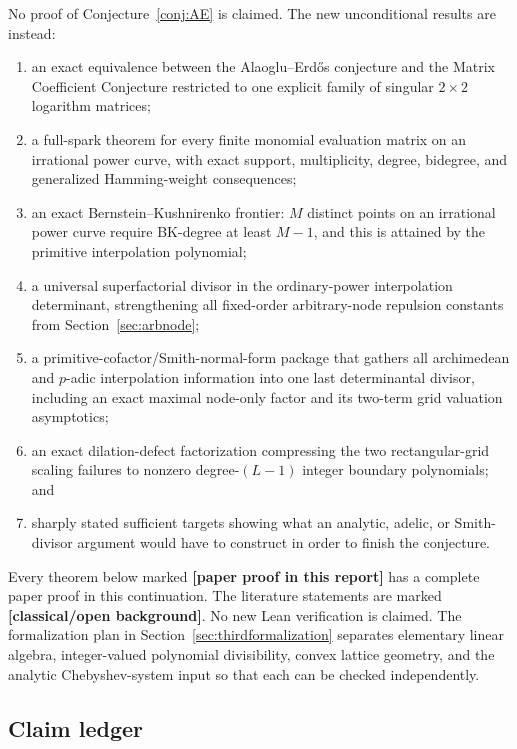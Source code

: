 \documentclass[11pt,oneside]{article}
\theoremstyle{definition}
\theoremstyle{remark}
\newcommand{\statusnew}{\textcolor{newgreen}{\textbf{[paper proof in this report]}}}
\newcommand{\statusknown}{\textcolor{classicalgray}{\textbf{[classical/open background]}}}
\begin{document}
No proof of Conjecture~\ref{conj:AE} is claimed.  The new unconditional results are instead:
\begin{enumerate}
\item an exact equivalence between the Alaoglu--Erd\H{o}s conjecture and the Matrix
      Coefficient Conjecture restricted to one explicit family of singular $2\times2$
      logarithm matrices;
\item a full-spark theorem for every finite monomial evaluation matrix on an irrational
      power curve, with exact support, multiplicity, degree, bidegree, and generalized
      Hamming-weight consequences;
\item an exact Bernstein--Kushnirenko frontier: $M$ distinct points on an irrational power
      curve require BK-degree at least $M-1$, and this is attained by the primitive
      interpolation polynomial;
\item a universal superfactorial divisor in the ordinary-power interpolation determinant,
      strengthening all fixed-order arbitrary-node repulsion constants from
      Section~\ref{sec:arbnode};
\item a primitive-cofactor/Smith-normal-form package that gathers all archimedean and
      $p$-adic interpolation information into one last determinantal divisor, including an
      exact maximal node-only factor and its two-term grid valuation asymptotics;
\item an exact dilation-defect factorization compressing the two rectangular-grid scaling
      failures to nonzero degree-$(L-1)$ integer boundary polynomials; and
\item sharply stated sufficient targets showing what an analytic, adelic, or Smith-divisor
      argument would have to construct in order to finish the conjecture.
\end{enumerate}

Every theorem below marked \statusnew{} has a complete paper proof in this continuation.  The
literature statements are marked \statusknown{}.  No new Lean verification is claimed.  The
formalization plan in Section~\ref{sec:thirdformalization} separates elementary linear algebra,
integer-valued polynomial divisibility, convex lattice geometry, and the analytic
Chebyshev-system input so that each can be checked independently.

\subsection{Claim ledger}
\end{document}
